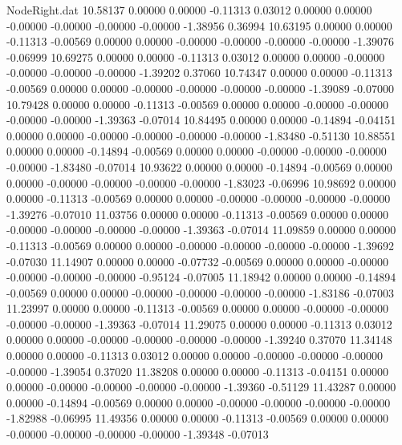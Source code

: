 \begin{filecontents}{NodeRight.dat}
  10.58137    0.00000    0.00000    -0.11313    0.03012    0.00000    0.00000   -0.00000   -0.00000   -0.00000   -0.00000   -1.38956    0.36994
  10.63195    0.00000    0.00000    -0.11313   -0.00569    0.00000    0.00000   -0.00000   -0.00000   -0.00000   -0.00000   -1.39076   -0.06999
  10.69275    0.00000    0.00000    -0.11313    0.03012    0.00000    0.00000   -0.00000   -0.00000   -0.00000   -0.00000   -1.39202    0.37060
  10.74347    0.00000    0.00000    -0.11313   -0.00569    0.00000    0.00000   -0.00000   -0.00000   -0.00000   -0.00000   -1.39089   -0.07000
  10.79428    0.00000    0.00000    -0.11313   -0.00569    0.00000    0.00000   -0.00000   -0.00000   -0.00000   -0.00000   -1.39363   -0.07014
  10.84495    0.00000    0.00000    -0.14894   -0.04151    0.00000    0.00000   -0.00000   -0.00000   -0.00000   -0.00000   -1.83480   -0.51130
  10.88551    0.00000    0.00000    -0.14894   -0.00569    0.00000    0.00000   -0.00000   -0.00000   -0.00000   -0.00000   -1.83480   -0.07014
  10.93622    0.00000    0.00000    -0.14894   -0.00569    0.00000    0.00000   -0.00000   -0.00000   -0.00000   -0.00000   -1.83023   -0.06996
  10.98692    0.00000    0.00000    -0.11313   -0.00569    0.00000    0.00000   -0.00000   -0.00000   -0.00000   -0.00000   -1.39276   -0.07010
  11.03756    0.00000    0.00000    -0.11313   -0.00569    0.00000    0.00000   -0.00000   -0.00000   -0.00000   -0.00000   -1.39363   -0.07014
  11.09859    0.00000    0.00000    -0.11313   -0.00569    0.00000    0.00000   -0.00000   -0.00000   -0.00000   -0.00000   -1.39692   -0.07030
  11.14907    0.00000    0.00000    -0.07732   -0.00569    0.00000    0.00000   -0.00000   -0.00000   -0.00000   -0.00000   -0.95124   -0.07005
  11.18942    0.00000    0.00000    -0.14894   -0.00569    0.00000    0.00000   -0.00000   -0.00000   -0.00000   -0.00000   -1.83186   -0.07003
  11.23997    0.00000    0.00000    -0.11313   -0.00569    0.00000    0.00000   -0.00000   -0.00000   -0.00000   -0.00000   -1.39363   -0.07014
  11.29075    0.00000    0.00000    -0.11313    0.03012    0.00000    0.00000   -0.00000   -0.00000   -0.00000   -0.00000   -1.39240    0.37070
  11.34148    0.00000    0.00000    -0.11313    0.03012    0.00000    0.00000   -0.00000   -0.00000   -0.00000   -0.00000   -1.39054    0.37020
  11.38208    0.00000    0.00000    -0.11313   -0.04151    0.00000    0.00000   -0.00000   -0.00000   -0.00000   -0.00000   -1.39360   -0.51129
  11.43287    0.00000    0.00000    -0.14894   -0.00569    0.00000    0.00000   -0.00000   -0.00000   -0.00000   -0.00000   -1.82988   -0.06995
  11.49356    0.00000    0.00000    -0.11313   -0.00569    0.00000    0.00000   -0.00000   -0.00000   -0.00000   -0.00000   -1.39348   -0.07013

\end{filecontents}
